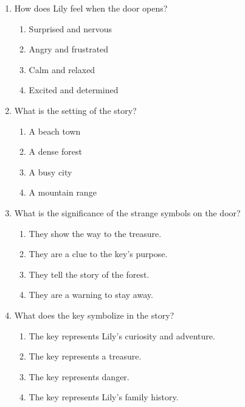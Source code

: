 \documentclass[12pt]{article}
\begin{document}
\begin{enumerate}
    \vspace{0.5cm}

    \item How does Lily feel when the door opens?
    \begin{enumerate}[label=\Alph*.]
        \item Surprised and nervous
        \item Angry and frustrated
        \item Calm and relaxed
        \item Excited and determined
    \end{enumerate}

    \vspace{0.5cm}

    \item What is the setting of the story?
    \begin{enumerate}[label=\Alph*.]
        \item A beach town
        \item A dense forest
        \item A busy city
        \item A mountain range
    \end{enumerate}

    \vspace{0.5cm}

    \item What is the significance of the strange symbols on the door?
    \begin{enumerate}[label=\Alph*.]
        \item They show the way to the treasure.
        \item They are a clue to the key’s purpose.
        \item They tell the story of the forest.
        \item They are a warning to stay away.
    \end{enumerate}

    \vspace{0.5cm}

    \item What does the key symbolize in the story?
    \begin{enumerate}[label=\Alph*.]
        \item The key represents Lily’s curiosity and adventure.
        \item The key represents a treasure.
        \item The key represents danger.
        \item The key represents Lily’s family history.
    \end{enumerate}


\end{enumerate}
\end{document}
